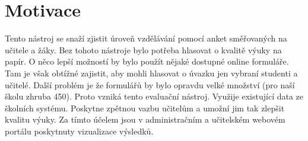 \section{Motivace}
Tento nástroj se snaží zjistit úroveň vzdělávání pomocí anket směřovaných na učitele a žáky. Bez tohoto nástroje bylo potřeba hlasovat o kvalitě výuky na papír. O něco lepší možností by bylo použít nějaké dostupné online formuláře. Tam je však obtížné zajistit, aby mohli hlasovat o úvazku jen vybraní studenti a učitelé. Další problém je že formulářů by bylo opravdu velké množství (pro naší školu zhruba 450). Proto vzniká tento evaluační nástroj. Využije existující data ze školních systému. Poskytne zpětnou vazbu učitelům a umožní jim tak zlepšit kvalitu výuky. Za tímto účelem jsou v administračním a učitelském webovém portálu poskytnuty vizualizace výsledků.
